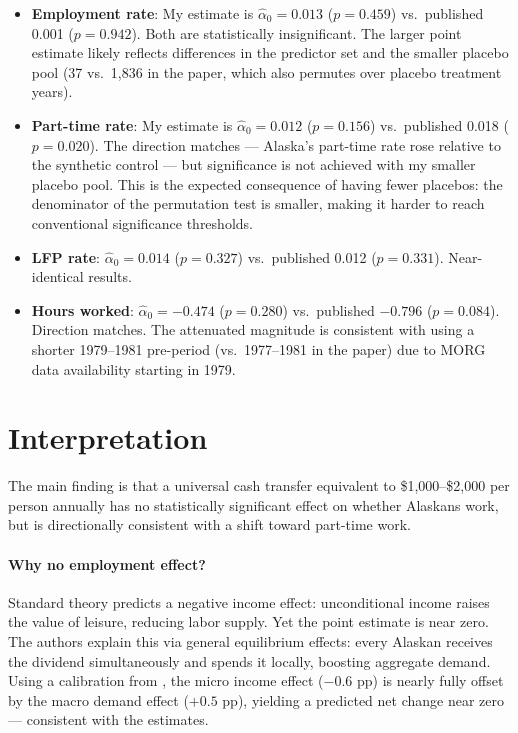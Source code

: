 \documentclass[12pt]{article}
\begin{document}
\begin{itemize}
  \item \textbf{Employment rate}: My estimate is $\hat{\alpha}_0 = 0.013$ ($p = 0.459$) vs.\ published 0.001 ($p = 0.942$). Both are statistically insignificant. The larger point estimate likely reflects differences in the predictor set and the smaller placebo pool (37 vs.\ 1,836 in the paper, which also permutes over placebo treatment years).

  \item \textbf{Part-time rate}: My estimate is $\hat{\alpha}_0 = 0.012$ ($p = 0.156$) vs.\ published 0.018 ($p = 0.020$). The direction matches — Alaska's part-time rate rose relative to the synthetic control — but significance is not achieved with my smaller placebo pool. This is the expected consequence of having fewer placebos: the denominator of the permutation test is smaller, making it harder to reach conventional significance thresholds.

  \item \textbf{LFP rate}: $\hat{\alpha}_0 = 0.014$ ($p = 0.327$) vs.\ published 0.012 ($p = 0.331$). Near-identical results.

  \item \textbf{Hours worked}: $\hat{\alpha}_0 = -0.474$ ($p = 0.280$) vs.\ published $-0.796$ ($p = 0.084$). Direction matches. The attenuated magnitude is consistent with using a shorter 1979--1981 pre-period (vs.\ 1977--1981 in the paper) due to MORG data availability starting in 1979.
\end{itemize}

\section{Interpretation}

The main finding is that a universal cash transfer equivalent to \$1,000--\$2,000 per person annually has no statistically significant effect on whether Alaskans work, but is directionally consistent with a shift toward part-time work.

\paragraph{Why no employment effect?}
Standard theory predicts a negative income effect: unconditional income raises the value of leisure, reducing labor supply. Yet the point estimate is near zero. The authors explain this via general equilibrium effects: every Alaskan receives the dividend simultaneously and spends it locally, boosting aggregate demand. Using a calibration from \citet{chodorowreich2019geographic}, the micro income effect ($-0.6$ pp) is nearly fully offset by the macro demand effect ($+0.5$ pp), yielding a predicted net change near zero — consistent with the estimates.
\end{document}
